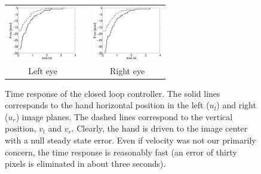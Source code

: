 \begin{figure}
  \begin{center}
	\begin{tabular}{ccc}
	  \parbox{30mm}{\includegraphics[width=30mm]{Figure/TimeReponseLeftClosedLoop.eps}}  & \hspace{.1cm} &
	  \parbox{30mm}{\includegraphics[width=30mm]{Figure/TimeReponseRightClosedLoop.eps}}
	  \\
	  \parbox{30mm}{\centering Left eye } & \hspace{0.1cm} & \parbox{30mm}{\centering Right eye }
  \end{tabular}
\end{center}
\caption{Time response of the closed loop controller. The solid lines corresponds to the hand horizontal position in the left ($u_l$) and right ($u_r$) image planes. The dashed lines correspond to the vertical position, $v_l$ and $v_r$. Clearly, the hand is driven to the image center with a null steady state error. Even if velocity was not our primarily concern, the time response is reasonably fast (an error of thirty pixels is eliminated in about 
three seconds). }\label{Fig:TimeResponseClosedLoopErrors}
  \end{figure}


